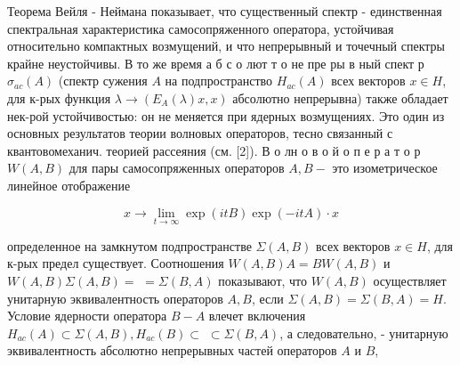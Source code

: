 \documentclass[10pt]{article}
\begin{document}
Теорема Вейля - Неймана показывает, что существенный спектр - единственная спектральная характеристика самосопряженного оператора, устойчивая относительно компактных возмущений, и что непрерывный и точечный спектры крайне неустойчивы. В то же время а б с о лют т о не пре ры в ный спект р $\sigma_{a c}(A)$ (спектр сужения $A$ на подпространство $H_{a c}(A)$ всех векторов $x \in H$, для к-рых функция $\lambda \rightarrow\left(E_{A}(\lambda) x, x\right)$ абсолютно непрерывна) также обладает нек-рой устойчивостью: он не меняется при ядерных возмущениях. Это один из основных результатов теории волновых операторов, тесно связанный с квантовомеханич. теорией рассеяния (см. [2]). В о лн о в о й о п е р а т о р $W(A, B)$ для пары самосопряженных операторов $A, B-$ это изометрическое линейное отображение



\[

x \rightarrow \lim _{t \rightarrow \infty} \exp (i t B) \exp (-i t A) \cdot x

\]



определенное на замкнутом подпространстве $\Sigma(A, B)$ всех векторов $x \in H$, для к-рых предел существует. Соотношения $W(A, B) A=B W(A, B)$ и $W(A, B) \Sigma(A, B)=$ $=\Sigma(B, A)$ показывают, что $W(A, B)$ осуществляет унитарную эквивалентность операторов $A, B$, если $\Sigma(A, B)=\Sigma(B, A)=H$. Условие ядерности оператора $B-A$ влечет включения $H_{a c}(A) \subset \Sigma(A, B), H_{a c}(B) \subset$ $\subset \Sigma(B, A)$, а следовательно, - унитарную эквивалентность абсолютно непрерывных частей операторов $A$ и $B$,
\end{document}
